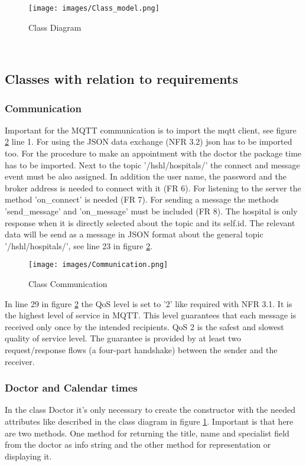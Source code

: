 \begin{figure}[H]
\centering
\sidecaption
\texttt{[image: images/Class\_model.png]}
\caption{Class Diagram}
\label{Class_diagram}
\end{figure}

\\
\subsection{Classes with relation to requirements}
\subsubsection{Communication}
Important for the MQTT communication is to import the mqtt client, see figure \ref{Communication} line 1. For using the JSON data exchange (NFR 3.2) json has to be imported too. For the procedure to make an appointment with the doctor the package time has to be imported. Next to the topic '/hshl/hospitals/' the connect and message event must be also assigned. In addition the user name, the password and the broker address is needed to connect with it (FR 6). For listening to the server the method 'on_connect' is needed (FR 7). For sending a message the methods 'send_message' and 'on_message' must be included (FR 8). The hospital is only response when it is directly selected about the topic and its self.id. The relevant data will be send as a message in JSON format about the general topic '/hshl/hospitals/', see line 23 in figure \ref{Communication}.

\begin{figure}[H]
\centering
\sidecaption
\texttt{[image: images/Communication.png]}
\caption{Class Communication}
\label{Communication}
\end{figure}

In line 29 in figure \ref{Communication} the QoS level is set to '2' like required with NFR 3.1. It is the highest level of service in MQTT. This level guarantees that each message is received only once by the intended recipients. QoS 2 is the safest and slowest quality of service level. The guarantee is provided by at least two request/response flows (a four-part handshake) between the sender and the receiver.

\subsubsection{Doctor and Calendar times}
In the class Doctor it's only necessary to create the constructor with the needed attributes like described in the class diagram in figure \ref{Class_diagram}. Important is that here are two methods. One method for returning the title, name and specialist field from the doctor as info string and the other method for representation or displaying it. 

